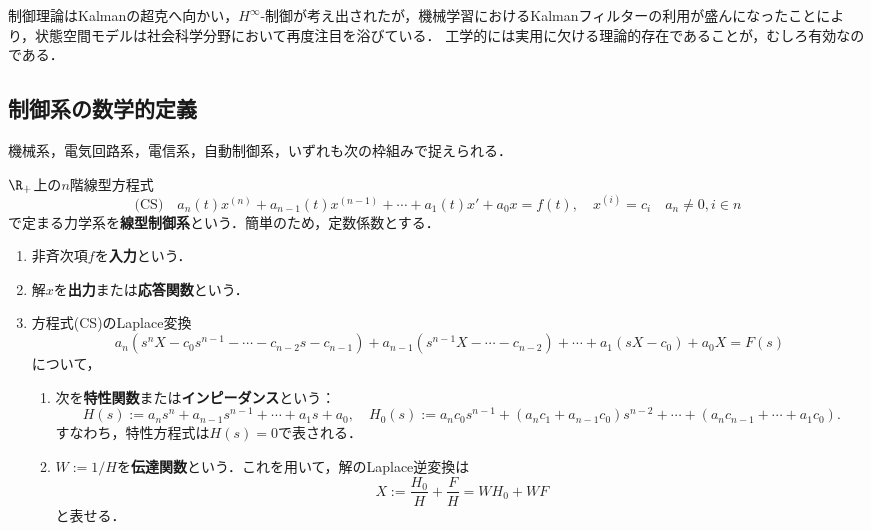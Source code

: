 \documentclass[uplatex,dvipdfmx]{jsreport}
\begin{document}
\begin{application}[状態空間モデルの計量経済学への応用]
    制御理論はKalmanの超克へ向かい，$H^\infty$-制御が考え出されたが，機械学習におけるKalmanフィルターの利用が盛んになったことにより，状態空間モデルは社会科学分野において再度注目を浴びている．
    工学的には実用に欠ける理論的存在であることが，むしろ有効なのである．

\end{application}

\subsection{制御系の数学的定義}

\begin{tcolorbox}[colframe=ForestGreen, colback=ForestGreen!10!white,breakable,colbacktitle=ForestGreen!40!white,coltitle=black,fonttitle=\bfseries\sffamily,
title=]
    機械系，電気回路系，電信系，自動制御系，いずれも次の枠組みで捉えられる．
\end{tcolorbox}

\begin{definition}
    $\R_+$上の$n$階線型方程式
    \[\text{(CS)}\quad a_n(t)x^{(n)}+a_{n-1}(t)x^{(n-1)}+\cdots+a_1(t)x'+a_0x=f(t),\quad x^{(i)}=c_i\quad a_n\ne0,i\in n\]
    で定まる力学系を\textbf{線型制御系}という．簡単のため，定数係数とする．
    \begin{enumerate}
        \item 非斉次項$f$を\textbf{入力}という．
        \item 解$x$を\textbf{出力}または\textbf{応答関数}という．
        \item 方程式(CS)のLaplace変換
        \[a_n(s^nX-c_0s^{n-1}-\cdots-c_{n-2}s-c_{n-1})+a_{n-1}(s^{n-1}X-\cdots-c_{n-2})+\cdots+a_1(sX-c_0)+a_0X=F(s)\]
        について，
        \begin{enumerate}
            \item 次を\textbf{特性関数}または\textbf{インピーダンス}という：
            \[H(s):=a_ns^n+a_{n-1}s^{n-1}+\cdots+a_1s+a_0,\quad H_0(s):=a_nc_0s^{n-1}+(a_nc_1+a_{n-1}c_0)s^{n-2}+\cdots+(a_nc_{n-1}+\cdots+a_1c_0).\]
            すなわち，特性方程式は$H(s)=0$で表される．
            \item $W:=1/H$を\textbf{伝達関数}という．これを用いて，解のLaplace逆変換は
            \[X:=\frac{H_0}{H}+\frac{F}{H}=WH_0+WF\]
            と表せる．
        \end{enumerate}
    \end{enumerate}
\end{definition}
\end{document}
